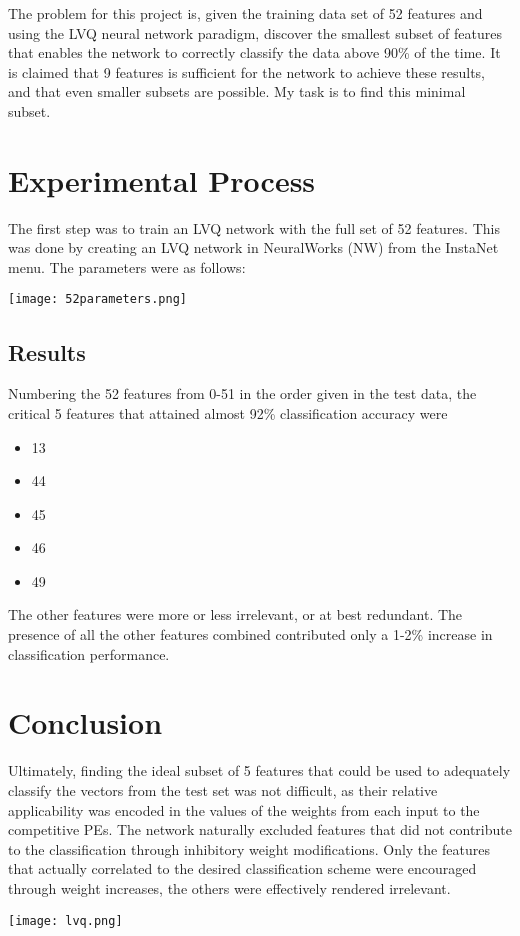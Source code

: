 \documentclass[12pt]{article}
\begin{document}
The problem for this project is, given the training data set of 52 features and using the LVQ neural network paradigm, discover the smallest subset of features that enables the network to correctly classify the data above 90\% of the time.  It is claimed that 9 features is sufficient for the network to achieve these results, and that even smaller subsets are possible.  My task is to find this minimal subset.

\section{Experimental Process}

The first step was to train an LVQ network with the full set of 52 features.  This was done by creating an LVQ network in NeuralWorks (NW) from the InstaNet menu.  The parameters were as follows:

\begin{center}
\texttt{[image: 52parameters.png]}
\end{center}




\subsection{Results}

Numbering the 52 features from 0-51 in the order given in the test data, the critical 5 features that attained almost 92\% classification accuracy were

\begin{itemize}
\item 13
\item 44
\item 45
\item 46
\item 49
\end{itemize}

The other features were more or less irrelevant, or at best redundant.  The presence of all the other features combined contributed only a 1-2\% increase in classification performance.

\section{Conclusion}

Ultimately, finding the ideal subset of 5 features that could be used to adequately classify the vectors from the test set was not difficult, as their relative applicability was encoded in the values of the weights from each input to the competitive PEs.  The network naturally excluded features that did not contribute to the classification through inhibitory weight modifications.  Only the features that actually correlated to the desired classification scheme were encouraged through weight increases, the others were effectively rendered irrelevant.  

\begin{center}
\texttt{[image: lvq.png]}
\end{center}
\end{document}
